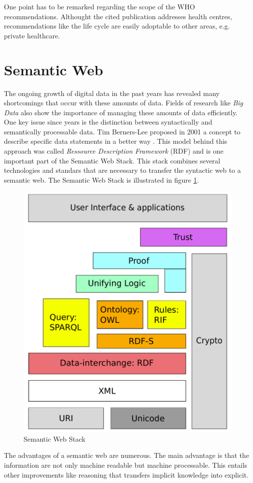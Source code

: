 One point has to be remarked regarding the scope of the WHO recommendations.
Althought the cited publication addresses health centres, recommendations like the life cycle are easily adoptable to other areas, e.g. private healthcare.

\section{Semantic Web}
\label{sec:semantic-web}
The ongoing growth of digital data in the past years has revealed many shortcomings that occur with these amounts of data.
Fields of research like \textit{Big Data} also show the importance of managing these amounts of data efficiently.
One key issue since years is the distinction between syntactically and semantically processable data.
Tim Berners-Lee proposed in 2001 a concept to describe specific data statements in a better way \cite{berners2001semantic}.
This model behind this approach was called \textit{Ressource Description Framework} (RDF) \cite{klyne2004resource} and is one important part of the Semantic Web Stack.
This stack combines several technologies and standars that are necessary to transfer the syntactic web to a semantic web.
The Semantic Web Stack is illustrated in figure \ref{fig:sem_stack}.
\begin{figure}
  \centering
  \includegraphics[scale=0.3]{preliminaries/semweb_stack}
  \caption{Semantic Web Stack}
  \label{fig:sem_stack}
\end{figure}
The advantages of a semantic web are numerous.
The main advantage is that the information are not only machine readable but machine processable.
This entails other improvements like reasoning that transfers implicit knowledge into explicit.

